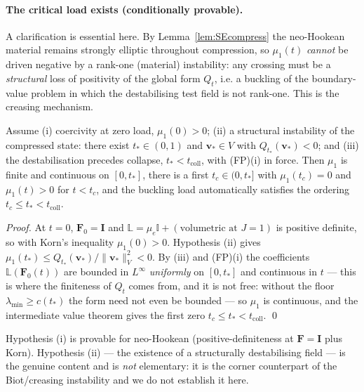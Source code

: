 \paragraph{The critical load exists (conditionally provable).}
A clarification is essential here. By Lemma~\ref{lem:SEcompress} the neo-Hookean material remains strongly elliptic
throughout compression, so $\mu_1(t)$ \emph{cannot} be driven negative by a rank-one (material) instability: any
crossing must be a \emph{structural} loss of positivity of the global form $Q_t$, i.e. a buckling of the boundary-value
problem in which the destabilising test field is not rank-one. This is the creasing mechanism.
\begin{lemma}
    \label{lem:tc}
    Assume (i) coercivity at zero load, $\mu_1(0)>0$; (ii) a structural instability of the compressed state: there
    exist $t_*\in(0,1)$ and $\bm{v}_*\in V$ with $Q_{t_*}(\bm{v}_*)<0$; and (iii) the destabilisation precedes
    collapse, $t_*<t_{\mathrm{coll}}$, with (FP)(i) in force. Then $\mu_1$ is finite and continuous on $[0,t_*]$,
    there is a first $t_c\in(0,t_*]$ with $\mu_1(t_c)=0$ and $\mu_1(t)>0$ for $t<t_c$, and the buckling load
    automatically satisfies the ordering $t_c\le t_*<t_{\mathrm{coll}}$.
\end{lemma}
\begin{proof}
    At $t=0$, $\bm{F}_0=\bm{I}$ and $\mathbb{L}=\mu_e\mathbb{I}+(\text{volumetric at }J{=}1)$ is positive definite, so
    with Korn's inequality $\mu_1(0)>0$. Hypothesis (ii) gives $\mu_1(t_*)\le Q_{t_*}(\bm{v}_*)/\|\bm{v}_*\|_V^2<0$.
    By (iii) and (FP)(i) the coefficients $\mathbb{L}(\bm{F}_0(t))$ are bounded in $L^\infty$ \emph{uniformly} on
    $[0,t_*]$ and continuous in $t$ --- this is where the finiteness of $Q_t$ comes from, and it is not free: without
    the floor $\lambda_{\min}\ge c(t_*)$ the form need not even be bounded --- so $\mu_1$ is continuous, and the
    intermediate value theorem gives the first zero $t_c\le t_*<t_{\mathrm{coll}}$. \qed
\end{proof}
\noindent Hypothesis (i) is provable for neo-Hookean (positive-definiteness at $\bm{F}=\bm{I}$ plus Korn). Hypothesis
(ii) --- the existence of a structurally destabilising field --- is the genuine content and is \emph{not} elementary: it
is the corner counterpart of the Biot/creasing instability \cite{Biot1963,Hong2009} and we do not establish it here.

